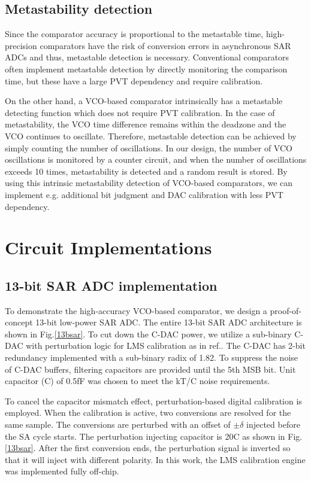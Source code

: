 \documentclass[journal]{IEEEtran}
\begin{document}
\subsection{Metastability detection}
Since the comparator accuracy is proportional to the metastable time, high-precision comparators have the risk of conversion errors in asynchronous SAR ADCs and thus, metastable detection is necessary.
Conventional comparators often implement metastable detection by directly monitoring the comparison time, but these have a large PVT dependency and require calibration\cite{shikata20120}.

On the other hand, a VCO-based comparator intrinsically has a metastable detecting function which does not require PVT calibration. In the case of metastability, the VCO time difference remains within the deadzone and the VCO continues to oscillate. Therefore, metastable detection can be achieved by simply counting the number of oscillations. In our design, the number of VCO oscillations is monitored by a counter circuit, and when the number of oscillations exceeds 10 times, metastability is detected and a random result is stored. By using this intrinsic metastability detection of VCO-based comparators, we can implement e.g. additional bit judgment \cite{shikata20120, ding20190} and DAC calibration \cite{zhu201914} with less PVT dependency.

\section{Circuit Implementations}

\subsection{13-bit SAR ADC implementation}
To demonstrate the high-accuracy VCO-based comparator, we design a proof-of-concept 13-bit low-power SAR ADC.
The entire 13-bit SAR ADC architecture is shown in Fig.\ref{13bsar}. To cut down the C-DAC power, we utilize a sub-binary C-DAC with perturbation logic for LMS calibration as in ref.\cite{liu201012b}. The C-DAC has 2-bit redundancy implemented with a sub-binary radix of 1.82. To suppress the noise of C-DAC buffers, filtering capacitors\cite{miki20154} are provided until the 5th MSB bit. Unit capacitor (C) of 0.5fF was chosen to meet the kT/C noise requirements.

To cancel the capacitor mismatch effect, perturbation-based digital calibration\cite{liu201012b} is employed. When the calibration is active, two conversions are resolved for the same sample. The conversions are perturbed with an offset of $\pm \delta$ injected before the SA cycle starts. The perturbation injecting capacitor is 20C as shown in Fig.\ref{13bsar}. After the first conversion ends, the perturbation signal is inverted so that it will inject with different polarity. In this work, the LMS calibration engine was implemented fully off-chip.
\end{document}
